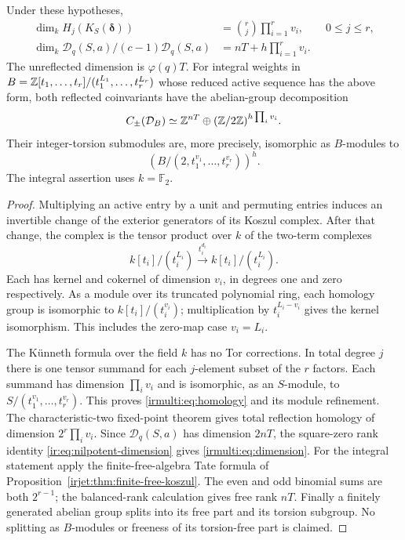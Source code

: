 \begin{theorem}
\label{irmulti:thm:dimension}
Under these hypotheses,
\begin{align}
 \dim_k H_j(K_S(\boldsymbol\delta))
   &=\binom rj\prod_{i=1}^r v_i,\qquad 0\le j\le r,
       \label{irmulti:eq:homology}\\
 \dim_k\mathcal D_q(S,a)/(c-1)\mathcal D_q(S,a)
   &=nT+h\prod_{i=1}^r v_i.\label{irmulti:eq:dimension}
\end{align}
The unreflected dimension is $\varphi(q)T$.
For integral weights in
$B=\mathbb{Z}[t_1,\ldots,t_r]/(t_1^{L_1},\ldots,t_r^{L_r})$
whose reduced active sequence has the above form, both reflected
coinvariants have the abelian-group decomposition
\[
 C_\pm(\mathcal D_B)\simeq
 \mathbb{Z}^{nT}\oplus(\mathbb{Z}/2\mathbb{Z})^{h\prod_i v_i}.
\]
Their integer-torsion submodules are, more precisely, isomorphic as
$B$-modules to
\[
 \left(B/(2,t_1^{v_1},\ldots,t_r^{v_r})\right)^h.
\]
The integral assertion uses $k=\mathbb F_2$.
\end{theorem}
\begin{proof}
Multiplying an active entry by a unit and permuting entries induces an
invertible change of the exterior generators of its Koszul complex.
After that change, the complex is the tensor product over $k$ of the
two-term complexes
\[
 k[t_i]/(t_i^{L_i})\xrightarrow{t_i^{d_i}}k[t_i]/(t_i^{L_i}).
\]
Each has kernel and cokernel of dimension $v_i$, in degrees one and
zero respectively. As a module over its truncated polynomial ring,
each homology group is isomorphic to $k[t_i]/(t_i^{v_i})$; multiplication
by $t_i^{L_i-v_i}$ gives the kernel isomorphism. This includes the
zero-map case $v_i=L_i$.

The K\"unneth formula over the field $k$ has no Tor corrections. In
total degree $j$ there is one tensor summand for each $j$-element subset
of the $r$ factors. Each summand has dimension $\prod_i v_i$ and is
isomorphic, as an $S$-module, to
$S/(t_1^{v_1},\ldots,t_r^{v_r})$.
This proves \eqref{irmulti:eq:homology} and its module refinement.
The characteristic-two fixed-point theorem gives total reflection
homology of dimension $2^r\prod_i v_i$. Since $\mathcal D_q(S,a)$
has dimension $2nT$, the square-zero rank identity
\eqref{ir:eq:nilpotent-dimension} gives \eqref{irmulti:eq:dimension}.
For the integral statement apply the finite-free-algebra Tate formula
of Proposition~\ref{irjet:thm:finite-free-koszul}. The even and odd
binomial sums are both $2^{r-1}$; the balanced-rank calculation gives
free rank $nT$. Finally a finitely generated abelian group splits into
its free part and its torsion subgroup. No splitting as $B$-modules
or freeness of its torsion-free part is claimed.
\end{proof}

